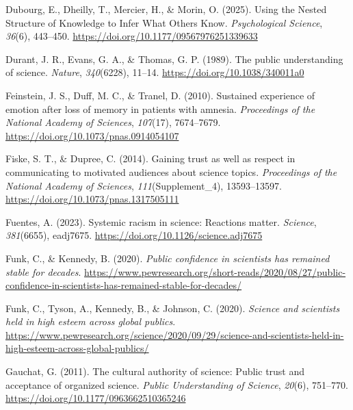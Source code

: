 \documentclass[
  jou,
  floatsintext,
  longtable,
  nolmodern,
  notxfonts,
  notimes,
  colorlinks=true,linkcolor=blue,citecolor=blue,urlcolor=blue]{apa7}
\newlength{\cslhangindent}
\newenvironment{CSLReferences}[2] %
 {\begin{list}{}{%
  \setlength{\itemindent}{0pt}
  \setlength{\leftmargin}{0pt}
  \setlength{\parsep}{0pt}
  \ifodd #1
   \setlength{\leftmargin}{\cslhangindent}
   \setlength{\itemindent}{-1\cslhangindent}
  \fi
  \setlength{\itemsep}{#2\baselineskip}}}
 {\end{list}}
\begin{document}
\begin{CSLReferences}{1}{0}
Dubourg, E., Dheilly, T., Mercier, H., \& Morin, O. (2025). Using the
Nested Structure of Knowledge to Infer What Others Know.
\emph{Psychological Science}, \emph{36}(6), 443--450.
\url{https://doi.org/10.1177/09567976251339633}

Durant, J. R., Evans, G. A., \& Thomas, G. P. (1989). The public
understanding of science. \emph{Nature}, \emph{340}(6228), 11--14.
\url{https://doi.org/10.1038/340011a0}

Feinstein, J. S., Duff, M. C., \& Tranel, D. (2010). Sustained
experience of emotion after loss of memory in patients with amnesia.
\emph{Proceedings of the National Academy of Sciences}, \emph{107}(17),
7674--7679. \url{https://doi.org/10.1073/pnas.0914054107}

Fiske, S. T., \& Dupree, C. (2014). Gaining trust as well as respect in
communicating to motivated audiences about science topics.
\emph{Proceedings of the National Academy of Sciences},
\emph{111}(Supplement{\_}4), 13593--13597.
\url{https://doi.org/10.1073/pnas.1317505111}

Fuentes, A. (2023). Systemic racism in science: Reactions matter.
\emph{Science}, \emph{381}(6655), eadj7675.
\url{https://doi.org/10.1126/science.adj7675}

Funk, C., \& Kennedy, B. (2020). \emph{Public confidence in scientists
has remained stable for decades}.
\url{https://www.pewresearch.org/short-reads/2020/08/27/public-confidence-in-scientists-has-remained-stable-for-decades/}

Funk, C., Tyson, A., Kennedy, B., \& Johnson, C. (2020). \emph{Science
and scientists held in high esteem across global publics}.
\url{https://www.pewresearch.org/science/2020/09/29/science-and-scientists-held-in-high-esteem-across-global-publics/}

Gauchat, G. (2011). The cultural authority of science: Public trust and
acceptance of organized science. \emph{Public Understanding of Science},
\emph{20}(6), 751--770. \url{https://doi.org/10.1177/0963662510365246}


\end{CSLReferences}
\end{document}

